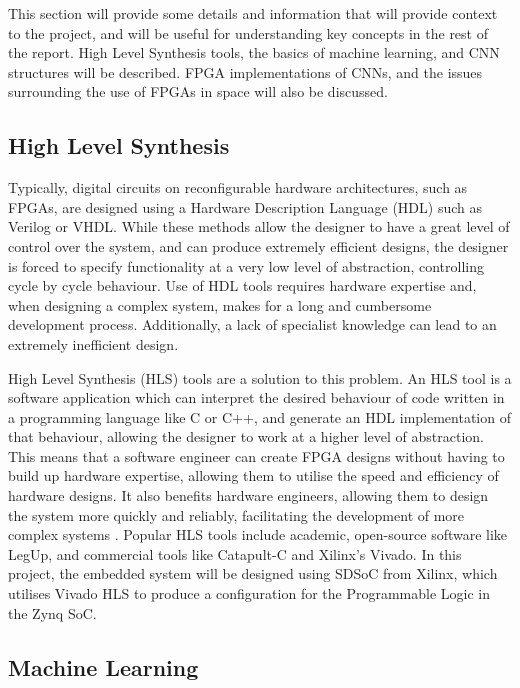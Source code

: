 \documentclass[12pt]{article}
\begin{document}
This section will provide some details and information that will provide context to the project, and will be useful for understanding key concepts in the rest of the report. High Level Synthesis tools, the basics of machine learning, and CNN structures will be described. FPGA implementations of CNNs, and the issues surrounding the use of FPGAs in space will also be discussed.

\subsection{High Level Synthesis}
\label{sec:Background-HLS}

Typically, digital circuits on reconfigurable hardware architectures, such as FPGAs, are designed using a Hardware Description Language (HDL) such as Verilog or VHDL. While these methods allow the designer to have a great level of control over the system, and can produce extremely efficient designs, the designer is forced to specify functionality at a very low level of abstraction, controlling cycle by cycle behaviour. Use of HDL tools requires hardware expertise and, when designing a complex system, makes for a long and cumbersome development process. Additionally, a lack of specialist knowledge can lead to an extremely inefficient design.

High Level Synthesis (HLS) tools are a  solution to this problem. An HLS tool is a software application which can interpret the desired behaviour of code written in a programming language like C or C++, and generate an HDL implementation of that behaviour, allowing the designer to work at a higher level of abstraction. This means that a software engineer can create FPGA designs without having to build up hardware expertise, allowing them to utilise the speed and efficiency of hardware designs. It also benefits hardware engineers, allowing them to design the system more quickly and reliably, facilitating the development of more complex systems \cite{HLS}. Popular HLS tools include academic, open-source software like LegUp, and commercial tools like Catapult-C and Xilinx's Vivado. In this project, the embedded system will be designed using SDSoC from Xilinx, which utilises Vivado HLS to produce a configuration for the Programmable Logic in the Zynq SoC.

\subsection{Machine Learning}
\label{sec:Background-ML}
\end{document}
